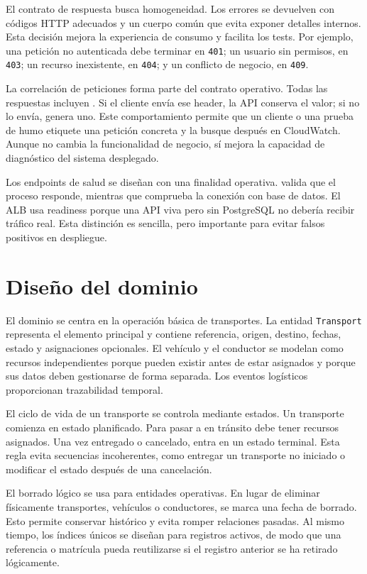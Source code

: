 El contrato de respuesta busca homogeneidad. Los errores se devuelven con códigos HTTP adecuados y un cuerpo común que evita exponer detalles internos. Esta decisión mejora la experiencia de consumo y facilita los tests. Por ejemplo, una petición no autenticada debe terminar en \texttt{401}; un usuario sin permisos, en \texttt{403}; un recurso inexistente, en \texttt{404}; y un conflicto de negocio, en \texttt{409}.

La correlación de peticiones forma parte del contrato operativo. Todas las respuestas incluyen . Si el cliente envía ese header, la API conserva el valor; si no lo envía, genera uno. Este comportamiento permite que un cliente o una prueba de humo etiquete una petición concreta y la busque después en CloudWatch. Aunque no cambia la funcionalidad de negocio, sí mejora la capacidad de diagnóstico del sistema desplegado.

Los endpoints de salud se diseñan con una finalidad operativa.  valida que el proceso responde, mientras que  comprueba la conexión con base de datos. El ALB usa readiness porque una API viva pero sin PostgreSQL no debería recibir tráfico real. Esta distinción es sencilla, pero importante para evitar falsos positivos en despliegue.

\section{Diseño del dominio}
\label{sec:diseno-dominio-detallado}

El dominio se centra en la operación básica de transportes. La entidad \texttt{Transport} representa el elemento principal y contiene referencia, origen, destino, fechas, estado y asignaciones opcionales. El vehículo y el conductor se modelan como recursos independientes porque pueden existir antes de estar asignados y porque sus datos deben gestionarse de forma separada. Los eventos logísticos proporcionan trazabilidad temporal.

El ciclo de vida de un transporte se controla mediante estados. Un transporte comienza en estado planificado. Para pasar a en tránsito debe tener recursos asignados. Una vez entregado o cancelado, entra en un estado terminal. Esta regla evita secuencias incoherentes, como entregar un transporte no iniciado o modificar el estado después de una cancelación.

El borrado lógico se usa para entidades operativas. En lugar de eliminar físicamente transportes, vehículos o conductores, se marca una fecha de borrado. Esto permite conservar histórico y evita romper relaciones pasadas. Al mismo tiempo, los índices únicos se diseñan para registros activos, de modo que una referencia o matrícula pueda reutilizarse si el registro anterior se ha retirado lógicamente.

